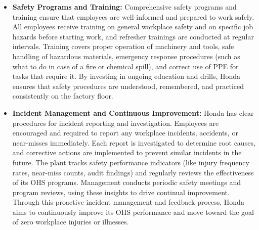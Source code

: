 \begin{itemize}
    \item \textbf{Safety Programs and Training:} Comprehensive safety programs and training ensure that employees are well-informed and prepared to work safely. All employees receive training on general workplace safety and on specific job hazards before starting work, and refresher trainings are conducted at regular intervals. Training covers proper operation of machinery and tools, safe handling of hazardous materials, emergency response procedures (such as what to do in case of a fire or chemical spill), and correct use of PPE for tasks that require it. By investing in ongoing education and drills, Honda ensures that safety procedures are understood, remembered, and practiced consistently on the factory floor.
    \item \textbf{Incident Management and Continuous Improvement:} Honda has clear procedures for incident reporting and investigation. Employees are encouraged and required to report any workplace incidents, accidents, or near-misses immediately. Each report is investigated to determine root causes, and corrective actions are implemented to prevent similar incidents in the future. The plant tracks safety performance indicators (like injury frequency rates, near-miss counts, audit findings) and regularly reviews the effectiveness of its OHS programs. Management conducts periodic safety meetings and program reviews, using these insights to drive continual improvement. Through this proactive incident management and feedback process, Honda aims to continuously improve its OHS performance and move toward the goal of zero workplace injuries or illnesses.
\end{itemize}

